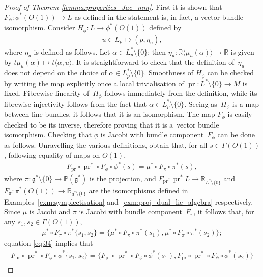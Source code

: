\documentclass[10pt,a4paper]{amsart}
\numberwithin{equation}{section}
\newcommand{\pg}{\mathbb{P}(\mathfrak{g}^*)} %
\newcommand{\RR}{\mathbb{R}}
\begin{document}
\begin{proof}[Proof of Theorem \ref{lemma:properties_Jac_mm}] First it is shown that $F_{\phi} \colon \phi^*(O(1)) \to L$ as def\/ined in the statement is, in fact, a vector bundle isomorphism. Consider $H_{\phi} \colon L \to \phi^*(O(1))$ def\/ined by
 \begin{gather*}
 u \in L_p \mapsto (p,\eta_u),
 \end{gather*}
where $\eta_u$ is def\/ined as follows. Let $\alpha \in L^*_p \setminus \{0\}$; then $\eta_u \colon \RR \langle \mu_u(\alpha)\rangle \to \RR$ is given by $t\mu_u(\alpha) \mapsto t \langle \alpha , u \rangle$. It is straightforward to check that the def\/inition of~$\eta_u$ does not depend on the choice of $\alpha \in L^*_p \setminus \{0\}$. Smoothness of $H_{\phi}$ can be checked by writing the map explicitly once a local trivialisation of $\operatorname{pr} \colon L^*\setminus \{0\} \to M$ is f\/ixed. Fibrewise linearity of~$H_{\phi}$ follows immediately from the def\/inition, while its f\/ibrewise injectivity follows from the fact that $\alpha \in L^*_p \setminus \{0\}$. Seeing as~$H_{\phi}$ is a map between line bundles, it follows that it is an isomorphism. The map $F_{\phi}$ is easily checked to be its inverse, therefore proving that it is a~vector bundle isomorphism. Checking that $\phi$ is Jacobi with bundle component~$F_{\phi}$ can be done as follows. Unravelling the various def\/initions, obtain that, for all $s \in \Gamma(O(1))$, following equality of maps on $O(1)$,
 \begin{gather} \label{eq:34}
 F_{\operatorname{pr}} \circ \operatorname{pr}^* \circ F_{\phi} \circ \phi^*(s) = \mu^* \circ F_{\pi} \circ \pi^*(s),
 \end{gather}
where $\pi \colon \mathfrak{g}^* \setminus \{0\} \to \pg$ is the projection, and $F_{\operatorname{pr}} \colon \operatorname{pr}^*L \to \RR_{L^* \setminus \{0\}}$ and $F_{\pi} \colon \pi^*(O(1)) \to \RR_{\mathfrak{g}^* \setminus \{0\}}$ are the isomorphisms def\/ined in Examples~\ref{exm:symplectisation} and~\ref{exm:proj_dual_lie_algebra} respectively. Since $\mu$ is Jacobi and $\pi$ is Jacobi with bundle component~$F_{\pi}$, it follows that, for any $s_1,s_2 \in \Gamma(O(1))$,
 \begin{gather*}
 \mu^* \circ F_{\pi} \circ \pi^* \{s_1,s_2\} = \{\mu^* \circ F_{\pi} \circ \pi^*(s_1), \mu^* \circ F_{\pi} \circ \pi^*(s_2)\};
 \end{gather*}
equation \eqref{eq:34} implies that
 \begin{gather}
 F_{\operatorname{pr}} \circ \operatorname{pr}^* \circ F_{\phi} \circ \phi^*\{s_1,s_2\} = \{ F_{\operatorname{pr}} \circ \operatorname{pr}^* \circ F_{\phi} \circ \phi^*(s_1), F_{\operatorname{pr}} \circ \operatorname{pr}^* \circ F_{\phi} \circ \phi^*(s_2)\} \nonumber\\

\end{gather}
\end{proof}
\end{document}
